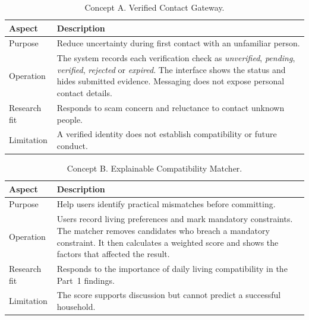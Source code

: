 \documentclass[11pt,a4paper]{article}
\begin{document}
\begin{table}[H]
    \centering
    \small
    \caption{Concept A. Verified Contact Gateway.}
    \begin{tabularx}{\textwidth}{@{}L{3.2cm}Y@{}}
        \toprule
        Aspect & Description\\
        \midrule
        Purpose & Reduce uncertainty during first contact with an unfamiliar person.\\
        Operation & The system records each verification check as \textit{unverified}, \textit{pending}, \textit{verified}, \textit{rejected} or \textit{expired}. The interface shows the status and hides submitted evidence. Messaging does not expose personal contact details.\\
        Research fit & Responds to scam concern and reluctance to contact unknown people.\\
        Limitation & A verified identity does not establish compatibility or future conduct.\\
        \bottomrule
    \end{tabularx}
    \label{tabconcepta}
\end{table}

\begin{table}[H]
    \centering
    \small
    \caption{Concept B. Explainable Compatibility Matcher.}
    \begin{tabularx}{\textwidth}{@{}L{3.2cm}Y@{}}
        \toprule
        Aspect & Description\\
        \midrule
        Purpose & Help users identify practical mismatches before committing.\\
        Operation & Users record living preferences and mark mandatory constraints. The matcher removes candidates who breach a mandatory constraint. It then calculates a weighted score and shows the factors that affected the result.\\
        Research fit & Responds to the importance of daily living compatibility in the Part~1 findings.\\
        Limitation & The score supports discussion but cannot predict a successful household.\\
        \bottomrule
    \end{tabularx}
    \label{tabconceptb}
\end{table}
\end{document}
